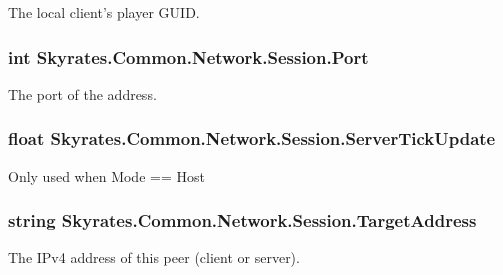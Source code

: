 The local client's player G\-U\-I\-D. 

\hypertarget{class_skyrates_1_1_common_1_1_network_1_1_session_aed90ad75336095fa3287c961aba40c7b}{
\subsubsection[{Port}]{\setlength{\rightskip}{0pt plus 5cm}int Skyrates.\-Common.\-Network.\-Session.\-Port}}\label{class_skyrates_1_1_common_1_1_network_1_1_session_aed90ad75336095fa3287c961aba40c7b}


The port of the address. 

\hypertarget{class_skyrates_1_1_common_1_1_network_1_1_session_aa5dc95f5f695af9aa5c0a170036a46b3}{
\subsubsection[{Server\-Tick\-Update}]{\setlength{\rightskip}{0pt plus 5cm}float Skyrates.\-Common.\-Network.\-Session.\-Server\-Tick\-Update}}\label{class_skyrates_1_1_common_1_1_network_1_1_session_aa5dc95f5f695af9aa5c0a170036a46b3}


Only used when Mode == Host 

\hypertarget{class_skyrates_1_1_common_1_1_network_1_1_session_a6d550a6d31777ca6d1d6dfba00c7955b}{
\subsubsection[{Target\-Address}]{\setlength{\rightskip}{0pt plus 5cm}string Skyrates.\-Common.\-Network.\-Session.\-Target\-Address}}\label{class_skyrates_1_1_common_1_1_network_1_1_session_a6d550a6d31777ca6d1d6dfba00c7955b}


The I\-Pv4 address of this peer (client or server). 



